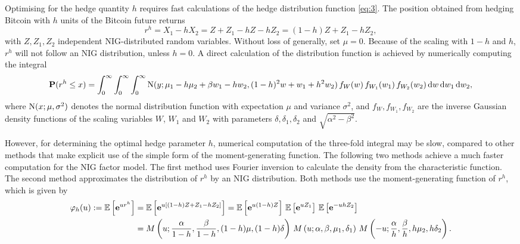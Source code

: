 Optimising for the hedge quantity $h$ requires fast calculations of
the hedge distribution function \eqref{eq:3}. The position obtained
from hedging Bitcoin with $h$ units of the Bitcoin future returns
\begin{equation*}
  r^h = X_1 - h X_2 = Z + Z_1 - h Z - h Z_2 = (1-h) Z + Z_1 - h Z_2,
\end{equation*}
with $Z, Z_1, Z_2$ independent NIG-distributed random
variables. Without loss of generally, set $\mu=0$. Because of the
scaling with $1-h$ and $h$, $r^h$ will not follow an NIG distribution,
unless $h=0$.  A direct calculation of the distribution function is
achieved by numerically computing the integral
\begin{equation*}
  {\bf P}(r^h\leq x) = \int_0^\infty \int_0^\infty \int_0^\infty
  {\rm N}(y; \mu_1 - h \mu_2 + \beta w_1 - h w_2, (1-h)^2 w + w_1 + h^2
  w_2)\, f_W(w)\, f_{W_1}(w_1)\, f_{W_2} (w_2)\, {\rm d} w\, {\rm d} w_1\, {\rm d} w_2,
\end{equation*}
where ${\rm N}(x; \mu, \sigma^2)$ denotes the normal distribution
function with expectation $\mu$ and variance $\sigma^2$, and
$f_W, f_{W_1}, f_{W_2}$ are the inverse Gaussian density functions of the
scaling variables $W$, $W_1$ and $W_2$ with parameters
$\delta, \delta_1, \delta_2$ and $\sqrt{\alpha^2-\beta^2}$. 

However, for determining the optimal hedge parameter $h$, numerical
computation of the three-fold integral may be slow, compared to other
methods that make explicit use of the simple form of the
moment-generating function.  The following two methods achieve a much
faster computation for the NIG factor model.  The first method uses
Fourier inversion to calculate the density from the characteristic
function. The second method approximates the distribution of $r^h$ by
an NIG distribution.  Both methods use the moment-generating function
of $r^h$, which is given by
\begin{align}
  \varphi_h(u):=\E\left[\e^{u r^h}\right]
  &= \E\left[ \e^{u[(1-h) Z + Z_1 -h Z_2]}\right] %
    = \E\left[ \e^{u(1-h) Z}\right]\, \E\left[ \e^{u Z_1}\right] \,
    \E\left[ \e^{-u h Z_2}\right]\nonumber\\
  &=M\left(u;\frac{\alpha}{1-h}, \frac{\beta}{1-h}, (1-h)\mu,
    (1-h)\delta\right)\,
    M\left(u; \alpha, \beta, \mu_1, \delta_1\right)\,
    M\left(-u; \frac{\alpha}{h}, \frac{\beta}{h}, h\mu_2,
    h\delta_2\right).
    \label{eq:7}
\end{align}



